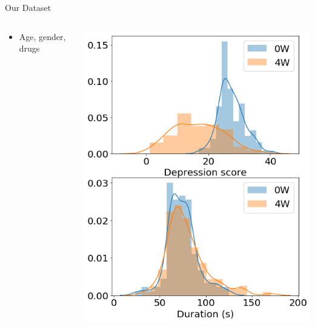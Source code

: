 \documentclass{beamer}
\begin{document}
\begin{frame}{Our Dataset}
\begin{columns}
\begin{itemize}
\begin{itemize}
                       \item Age, gender, drugs
                  \end{itemize}
        \end{itemize}
        \vfill
			\includegraphics[width=\linewidth]{./Images/depscores_2.png}
	\end{columns}

\end{frame}

\end{document}
